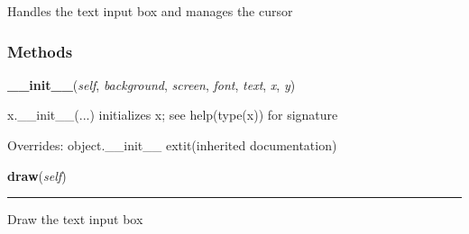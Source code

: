 Handles the text input box and manages the cursor



  \subsubsection{Methods}

    \vspace{0.5ex}

\hspace{.8\funcindent}\begin{boxedminipage}{\funcwidth}

    \raggedright \textbf{\_\_init\_\_}(\textit{self}, \textit{background}, \textit{screen}, \textit{font}, \textit{text}, \textit{x}, \textit{y})

\setlength{\parskip}{2ex}
    x.\_\_init\_\_(...) initializes x; see help(type(x)) for signature

\setlength{\parskip}{1ex}
      Overrides: object.\_\_init\_\_ 	extit{(inherited documentation)}

    \end{boxedminipage}

    \label{pygame-asteroids:virtual_keyboard:TextInput:draw}

    \vspace{0.5ex}

\hspace{.8\funcindent}\begin{boxedminipage}{\funcwidth}

    \raggedright \textbf{draw}(\textit{self})

    \vspace{-1.5ex}

    \rule{\textwidth}{0.5\fboxrule}
\setlength{\parskip}{2ex}
    Draw the text input box

\setlength{\parskip}{1ex}
    \end{boxedminipage}

    \label{pygame-asteroids:virtual_keyboard:TextInput:flashcursor}

